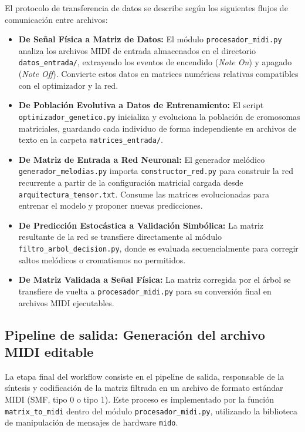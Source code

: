 \documentclass[12pt]{report}
\begin{document}
El protocolo de transferencia de datos se describe según los siguientes flujos de comunicación entre archivos:
\begin{itemize}
    \item \textbf{De Señal Física a Matriz de Datos:} El módulo \texttt{procesador\_midi.py} analiza los archivos MIDI de entrada almacenados en el directorio \texttt{datos\_entrada/}, extrayendo los eventos de encendido (\textit{Note On}) y apagado (\textit{Note Off}). Convierte estos datos en matrices numéricas relativas compatibles con el optimizador y la red.
    \item \textbf{De Población Evolutiva a Datos de Entrenamiento:} El script \texttt{optimizador\_genetico.py} inicializa y evoluciona la población de cromosomas matriciales, guardando cada individuo de forma independiente en archivos de texto en la carpeta \texttt{matrices\_entrada/}.
    \item \textbf{De Matriz de Entrada a Red Neuronal:} El generador melódico \texttt{generador\_melodias.py} importa \texttt{constructor\_red.py} para construir la red recurrente a partir de la configuración matricial cargada desde \texttt{arquitectura\_tensor.txt}. Consume las matrices evolucionadas para entrenar el modelo y proponer nuevas predicciones.
    \item \textbf{De Predicción Estocástica a Validación Simbólica:} La matriz resultante de la red se transfiere directamente al módulo \texttt{filtro\_arbol\_decision.py}, donde es evaluada secuencialmente para corregir saltos melódicos o cromatismos no permitidos.
    \item \textbf{De Matriz Validada a Señal Física:} La matriz corregida por el árbol se transfiere de vuelta a \texttt{procesador\_midi.py} para su conversión final en archivos MIDI ejecutables.
\end{itemize}

\subsection{Pipeline de salida: Generación del archivo MIDI editable}

La etapa final del workflow consiste en el pipeline de salida, responsable de la síntesis y codificación de la matriz filtrada en un archivo de formato estándar MIDI (SMF, tipo 0 o tipo 1). Este proceso es implementado por la función \texttt{matrix\_to\_midi} dentro del módulo \texttt{procesador\_midi.py}, utilizando la biblioteca de manipulación de mensajes de hardware \texttt{mido}.
\end{document}
